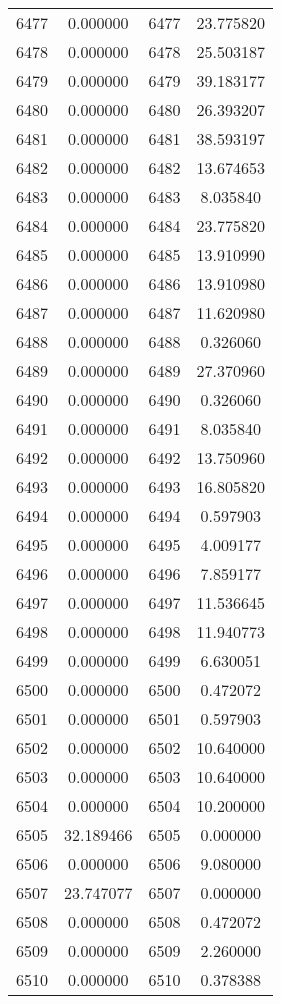\documentclass[12pt]{article}
\begin{document}
\begin{longtable}{@{}cccc@{}}
6477 & 0.000000 & 6477 & 23.775820 \\
6478 & 0.000000 & 6478 & 25.503187 \\
6479 & 0.000000 & 6479 & 39.183177 \\
6480 & 0.000000 & 6480 & 26.393207 \\
6481 & 0.000000 & 6481 & 38.593197 \\
6482 & 0.000000 & 6482 & 13.674653 \\
6483 & 0.000000 & 6483 & 8.035840 \\
6484 & 0.000000 & 6484 & 23.775820 \\
6485 & 0.000000 & 6485 & 13.910990 \\
6486 & 0.000000 & 6486 & 13.910980 \\
6487 & 0.000000 & 6487 & 11.620980 \\
6488 & 0.000000 & 6488 & 0.326060 \\
6489 & 0.000000 & 6489 & 27.370960 \\
6490 & 0.000000 & 6490 & 0.326060 \\
6491 & 0.000000 & 6491 & 8.035840 \\
6492 & 0.000000 & 6492 & 13.750960 \\
6493 & 0.000000 & 6493 & 16.805820 \\
6494 & 0.000000 & 6494 & 0.597903 \\
6495 & 0.000000 & 6495 & 4.009177 \\
6496 & 0.000000 & 6496 & 7.859177 \\
6497 & 0.000000 & 6497 & 11.536645 \\
6498 & 0.000000 & 6498 & 11.940773 \\
6499 & 0.000000 & 6499 & 6.630051 \\
6500 & 0.000000 & 6500 & 0.472072 \\
6501 & 0.000000 & 6501 & 0.597903 \\
6502 & 0.000000 & 6502 & 10.640000 \\
6503 & 0.000000 & 6503 & 10.640000 \\
6504 & 0.000000 & 6504 & 10.200000 \\
6505 & 32.189466 & 6505 & 0.000000 \\
6506 & 0.000000 & 6506 & 9.080000 \\
6507 & 23.747077 & 6507 & 0.000000 \\
6508 & 0.000000 & 6508 & 0.472072 \\
6509 & 0.000000 & 6509 & 2.260000 \\
6510 & 0.000000 & 6510 & 0.378388 \\

\end{longtable}
\end{document}
